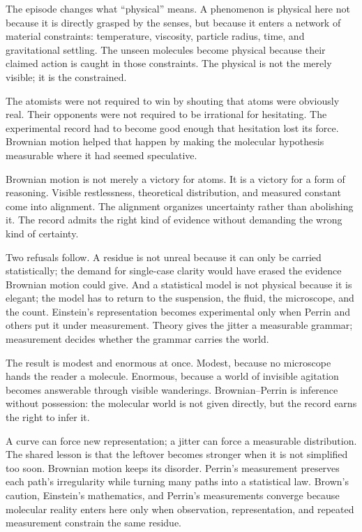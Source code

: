 The episode changes what ``physical'' means. A phenomenon is physical
here not because it is directly grasped by the senses, but because it
enters a network of material constraints: temperature, viscosity,
particle radius, time, and gravitational settling. The unseen molecules
become physical because their claimed action is caught in those
constraints. The physical is not the merely visible; it is the
constrained.

The atomists were not required to win by shouting that atoms were
obviously real. Their opponents were not required to be irrational for
hesitating. The experimental record had to become good enough that
hesitation lost its force. Brownian motion helped that happen by making
the molecular hypothesis measurable where it had seemed speculative.

Brownian motion is not merely a victory for atoms. It is a victory for a
form of reasoning. Visible restlessness, theoretical distribution, and
measured constant come into alignment. The alignment organizes
uncertainty rather than abolishing it. The record admits the right kind
of evidence without demanding the wrong kind of certainty.

Two refusals follow. A residue is not unreal because it can only be
carried statistically; the demand for single-case clarity would have
erased the evidence Brownian motion could give. And a statistical model
is not physical because it is elegant; the model has to return to the
suspension, the fluid, the microscope, and the count. Einstein's
representation becomes experimental only when Perrin and others put it
under measurement. Theory gives the jitter a measurable grammar;
measurement decides whether the grammar carries the world.

The result is modest and enormous at once. Modest, because no microscope
hands the reader a molecule. Enormous, because a world of invisible
agitation becomes answerable through visible wanderings. Brownian--Perrin
is inference without possession: the molecular world is not given
directly, but the record earns the right to infer it.

A curve can force new representation; a jitter can force a measurable
distribution. The shared lesson is that the leftover becomes stronger
when it is not simplified too soon. Brownian motion keeps its disorder.
Perrin's measurement preserves each path's irregularity while turning
many paths into a statistical law. Brown's caution, Einstein's
mathematics, and Perrin's measurements converge because molecular reality
enters here only when observation, representation, and repeated
measurement constrain the same residue.

